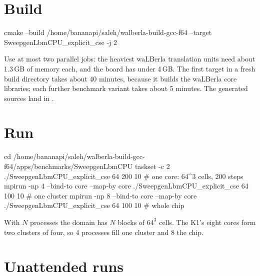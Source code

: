 \section{Build}\label{r02:sec:build}

\begin{shcode}
cmake --build /home/bananapi/saleh/walberla-build-gcc-f64 --target SweepgenLbmCPU_explicit_cse -j 2
\end{shcode}
Use at most two parallel jobs: the heaviest waLBerla translation units need about
1.3\,GB of memory each, and the board has under 4\,GB. The first target in a fresh build
directory takes about 40 minutes, because it builds the waLBerla core libraries; each
further benchmark variant takes about 5 minutes. The generated sources land in
.

\section{Run}\label{r02:sec:run}

\begin{shcode}
cd /home/bananapi/saleh/walberla-build-gcc-f64/apps/benchmarks/SweepgenLbmCPU
taskset -c 2 ./SweepgenLbmCPU_explicit_cse 64 200 10        # one core: 64^3 cells, 200 steps
mpirun -np 4 --bind-to core --map-by core ./SweepgenLbmCPU_explicit_cse 64 100 10   # one cluster
mpirun -np 8 --bind-to core --map-by core ./SweepgenLbmCPU_explicit_cse 64 100 10   # whole chip
\end{shcode}
With $N$ processes the domain has $N$ blocks of $64^3$ cells. The K1's eight cores form
two clusters of four, so 4 processes fill one cluster and 8 the chip.

\section{Unattended runs}\label{r02:sec:scripts}

